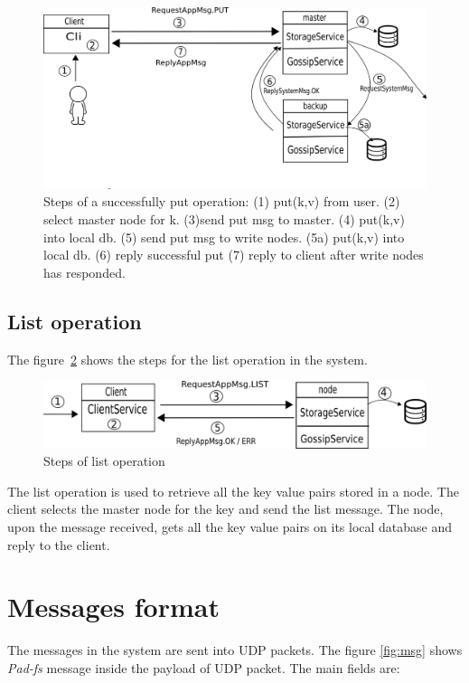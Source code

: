 \begin{figure}[H]
\centering
\includegraphics[scale=0.5]{figures/put.png}
\caption{Steps of a successfully put operation: (1) put(k,v) from user. (2) select master node for k. (3)send put msg to master. (4) put(k,v) into local db. (5) send put msg to write nodes. (5a) put(k,v) into local db. (6) reply successful put (7) reply to client after write nodes has responded. }
\label{fig:put}
\end{figure}

\subsection*{List operation}

The figure~\ref{fig:list} shows the steps for the list operation in the system.
\begin{figure}[H]
\centering
\includegraphics[scale=0.5]{figures/list.png}
\caption{Steps of list operation}
\label{fig:list}
\end{figure}

The list operation is used to retrieve all the key value pairs stored in a node.
The client selects the master node for the key and send the list message. The node, upon the message received, gets all the key value pairs on its local database and reply to the client.


\section{Messages format}
The messages in the system are sent into UDP packets. The figure \ref{fig:msg} shows \emph{Pad-fs} message inside the payload of UDP packet. The main fields are:

